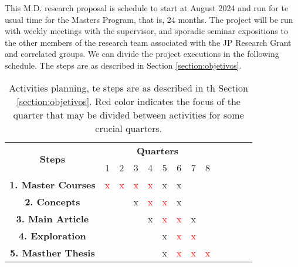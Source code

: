 
This M.D. research proposal is schedule to start at August 2024 and run for te usual time for the Masters Program, that is, 24 months. The project will be run with weekly meetings with the supervisor, and sporadic seminar expositions to the other members of the research team associated with the JP Research Grant and correlated groups. We can divide the project executions in the following schedule. The steps are as described in Section \ref{section:objetivos}.

\begin{table}[ht]
\centering
\begin{tabular}{|c|c|c|c|c|c|c|c|c|c|c|c|c|}
\hline
\multirow{2}{*}{{\bf Steps}} & \multicolumn{8}{c|}{{\bf Quarters}}
\\ \cline{2-9}
    & 1 & 2 & 3 & 4 & 5 & 6 & 7 & 8
\\ \hline
    {\bf 1. Master Courses} & \textcolor{red}{x} & \textcolor{red}{x} & \textcolor{red}{x} & \textcolor{red}{x} & x & x & & 
\\ \hline
    {\bf 2. Concepts} &  &  & x & \textcolor{red}{x} & \textcolor{red}{x} & x & &
\\ \hline
    {\bf 3. Main Article} & & & & x & \textcolor{red}{x} & \textcolor{red}{x} & x &
\\ \hline
    {\bf 4. Exploration} & & & & & x & \textcolor{red}{x} & \textcolor{red}{x} & 
\\ \hline
    {\bf 5. Masther Thesis} & & & & & x & \textcolor{red}{x} & \textcolor{red}{x} & \textcolor{red}{x}
\\ \hline
\end{tabular}
\caption{Activities planning, te steps are as described in th Section \ref{section:objetivos}. Red color indicates the focus of the quarter that may be divided between activities for some crucial quarters.}
\label{tab:cronograma1ano}
\end{table}